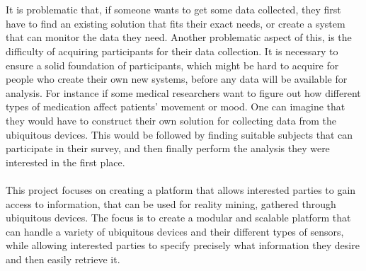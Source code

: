 \\\\
It is problematic that, if someone wants to get some data collected, they first have to find an existing solution that fits their exact needs, or create a system that can monitor the data they need. Another problematic aspect of this, is the difficulty of acquiring participants for their data collection. It is necessary to ensure a solid foundation of participants, which might be hard to acquire for people who create their own new systems, before any data will be available for analysis. For instance if some medical researchers want to figure out how different types of medication affect patients' movement or mood. One can imagine that they would have to construct their own solution for collecting data from the ubiquitous devices. This would be followed by finding suitable subjects that can participate in their survey, and then finally perform the analysis they were interested in the first place.
\\\\
This project focuses on creating a platform that allows interested parties to gain access to information, that can be used for reality mining, gathered through ubiquitous devices. The focus is to create a modular and scalable platform that can handle a variety of ubiquitous devices and their different types of sensors, while allowing interested parties to specify precisely what information they desire and then easily retrieve it.




